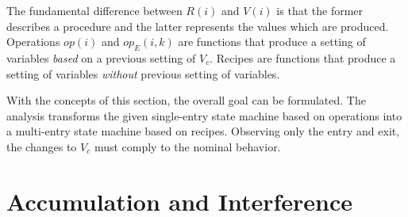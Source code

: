 \documentclass[12pt,a4paper]{scrartcl}
\begin{document}
The fundamental difference between $R(i)$ and $V(i)$ is that the former
describes a procedure and the latter represents the values which are produced.
Operations $op(i)$ and $op_E(i,k)$ are functions that produce a setting of
variables \textit{based} on a previous setting of $V_c$.  Recipes are functions
that produce a setting of variables \textit{without} previous setting of
variables.

With the concepts of this section, the overall goal can be formulated. The
analysis transforms the given single-entry state machine based on operations
into a multi-entry state machine based on recipes. Observing only the entry and
exit, the changes to $V_c$ must comply to the nominal behavior. 


%
\section{Accumulation and Interference}
\end{document}
